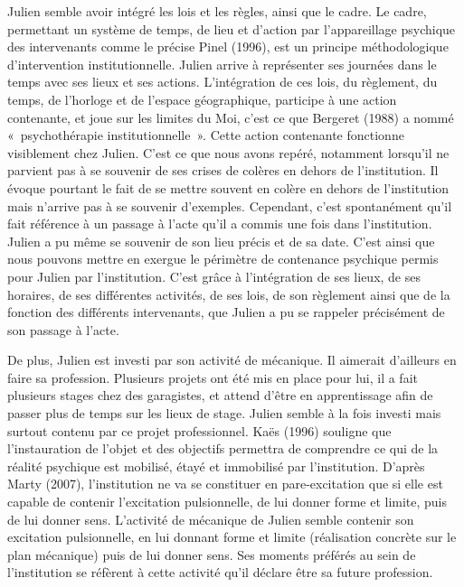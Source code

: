 \documentclass[12pt, a4paper]{book}
\begin{document}
\begin{spacing}{1.5}
Julien semble avoir intégré les lois et les règles, ainsi que le cadre. Le cadre, permettant un système de temps, de lieu et d'action par l'appareillage psychique des intervenants comme le précise Pinel (1996), est un principe méthodologique d'intervention institutionnelle. Julien arrive à représenter ses journées dans le temps avec ses lieux et ses actions. L'intégration de ces lois, du règlement, du temps, de l'horloge et de l'espace géographique, participe à une action contenante, et joue sur les limites du Moi, c'est ce que Bergeret (1988) a nommé « psychothérapie institutionnelle ». Cette action contenante fonctionne visiblement chez Julien. C'est ce que nous avons repéré, notamment lorsqu'il ne parvient pas à se souvenir de ses crises de colères en dehors de l'institution. Il évoque pourtant le fait de se mettre souvent en colère en dehors de l'institution mais n'arrive pas à se souvenir d'exemples. Cependant, c'est spontanément qu'il fait référence à un passage à l'acte qu'il a commis une fois dans l'institution. Julien a pu même se souvenir de son lieu précis et de sa date. C'est ainsi que nous pouvons mettre en exergue le périmètre de contenance psychique permis pour Julien par l'institution. C'est grâce à l'intégration de ses lieux, de ses horaires, de ses différentes activités, de ses lois, de son règlement ainsi que de la fonction des différents intervenants, que Julien a pu se rappeler précisément de son passage à l'acte.

De plus, Julien est investi par son activité de  mécanique. Il aimerait d'ailleurs en faire sa profession. Plusieurs projets ont été mis en place pour lui, il a fait plusieurs stages chez des garagistes, et attend d'être en apprentissage afin de passer plus de temps sur les lieux de stage. Julien semble à la fois investi mais surtout contenu par ce projet professionnel. Kaës (1996) souligne que l'instauration de l'objet et des objectifs permettra de comprendre ce qui de la réalité psychique est mobilisé, étayé et immobilisé par l'institution. D'après Marty (2007), l'institution ne va se constituer en pare-excitation que si elle est capable de contenir l'excitation pulsionnelle, de lui donner forme et limite, puis de lui donner sens. L'activité  de mécanique de Julien semble contenir son excitation pulsionnelle, en lui donnant forme et limite (réalisation concrète sur le plan mécanique) puis de lui donner sens. Ses moments préférés au sein de l'institution se réfèrent à cette activité qu'il déclare être sa future profession. 


\end{spacing}
\end{document}

